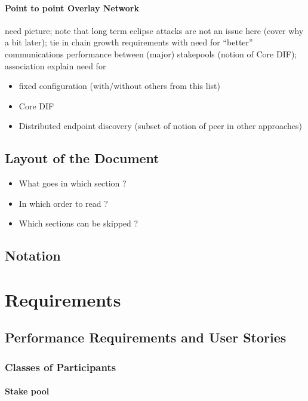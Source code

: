 \documentclass{report}
\newcommand{\wip}[1]{\color{magenta}{#1}\color{black}}
\theoremstyle{definition}{
  \newtheorem{lemma}{Lemma}[section] %
  \newtheorem{definition}[lemma]{Definition}
}
\theoremstyle{theorem}{
  \newtheorem{invariant}[lemma]{Invariant}
  \newtheorem{proofobligation}[lemma]{Proof Obligation}
}
\numberwithin{equation}{lemma}
\begin{document}
\subsubsection{Point to point Overlay Network}
need picture; note that long term eclipse attacks are not an issue
here (cover why a bit later); tie in chain growth requirements with
need for ``better'' communications performance between (major)
stakepools (notion of Core DIF); association explain need for
\begin{itemize}
\item fixed configuration (with/without others from this list)
\item Core DIF
\item Distributed endpoint discovery (subset of notion of peer in
  other approaches)
\end{itemize}

  
\section{Layout of the Document}

\begin{itemize}
  \item What goes in which section ?
  \item In which order to read ?
  \item Which sections can be skipped ?
\end{itemize}

\section{Notation}

\chapter{Requirements}

\section{Performance Requirements and User Stories}
\subsection{Classes of Participants}
\wip{todo: make a nice table}

\subsubsection{Stake pool} %
\end{document}
